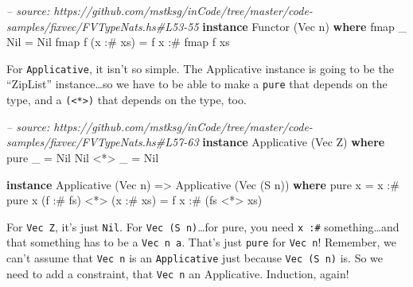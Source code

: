 \documentclass[]{article}
\newenvironment{Shaded}{\begin{snugshade}}{\end{snugshade}}
\newcommand{\CommentTok}[1]{\textcolor[rgb]{0.56,0.35,0.01}{\textit{#1}}}
\newcommand{\DataTypeTok}[1]{\textcolor[rgb]{0.13,0.29,0.53}{#1}}
\newcommand{\FunctionTok}[1]{\textcolor[rgb]{0.00,0.00,0.00}{#1}}
\newcommand{\KeywordTok}[1]{\textcolor[rgb]{0.13,0.29,0.53}{\textbf{#1}}}
\newcommand{\NormalTok}[1]{#1}
\newcommand{\OtherTok}[1]{\textcolor[rgb]{0.56,0.35,0.01}{#1}}
\begin{document}
\begin{Shaded}
\begin{Highlighting}[]
\CommentTok{-- source: https://github.com/mstksg/inCode/tree/master/code-samples/fixvec/FVTypeNats.hs#L53-55}
\KeywordTok{instance} \DataTypeTok{Functor}\NormalTok{ (}\DataTypeTok{Vec}\NormalTok{ n) }\KeywordTok{where}
\NormalTok{    fmap _ }\DataTypeTok{Nil}       \FunctionTok{=} \DataTypeTok{Nil}
\NormalTok{    fmap f (x }\FunctionTok{:#}\NormalTok{ xs) }\FunctionTok{=}\NormalTok{ f x }\FunctionTok{:#}\NormalTok{ fmap f xs}
\end{Highlighting}
\end{Shaded}

For \texttt{Applicative}, it isn't so simple. The Applicative instance is going
to be the ``ZipList'' instance\ldots{}so we have to be able to make a
\texttt{pure} that depends on the type, and a
\texttt{(\textless{}*\textgreater{})} that depends on the type, too.

\begin{Shaded}
\begin{Highlighting}[]
\CommentTok{-- source: https://github.com/mstksg/inCode/tree/master/code-samples/fixvec/FVTypeNats.hs#L57-63}
\KeywordTok{instance} \DataTypeTok{Applicative}\NormalTok{ (}\DataTypeTok{Vec} \DataTypeTok{Z}\NormalTok{) }\KeywordTok{where}
\NormalTok{    pure _    }\FunctionTok{=} \DataTypeTok{Nil}
    \DataTypeTok{Nil} \FunctionTok{<*>}\NormalTok{ _ }\FunctionTok{=} \DataTypeTok{Nil}

\KeywordTok{instance} \DataTypeTok{Applicative}\NormalTok{ (}\DataTypeTok{Vec}\NormalTok{ n) }\OtherTok{=>} \DataTypeTok{Applicative}\NormalTok{ (}\DataTypeTok{Vec}\NormalTok{ (}\DataTypeTok{S}\NormalTok{ n)) }\KeywordTok{where}
\NormalTok{    pure x }\FunctionTok{=}\NormalTok{ x }\FunctionTok{:#}\NormalTok{ pure x}
\NormalTok{    (f }\FunctionTok{:#}\NormalTok{ fs) }\FunctionTok{<*>}\NormalTok{ (x }\FunctionTok{:#}\NormalTok{ xs) }\FunctionTok{=}\NormalTok{ f x }\FunctionTok{:#}\NormalTok{ (fs }\FunctionTok{<*>}\NormalTok{ xs)}
\end{Highlighting}
\end{Shaded}

For \texttt{Vec\ Z}, it's just \texttt{Nil}. For \texttt{Vec\ (S\ n)}\ldots{}for
pure, you need \texttt{x\ :\#} something\ldots{}and that something has to be a
\texttt{Vec\ n\ a}. That's just \texttt{pure} for \texttt{Vec\ n}! Remember, we
can't assume that \texttt{Vec\ n} is an \texttt{Applicative} just because
\texttt{Vec\ (S\ n)} is. So we need to add a constraint, that \texttt{Vec\ n} an
Applicative. Induction, again!
\end{document}
